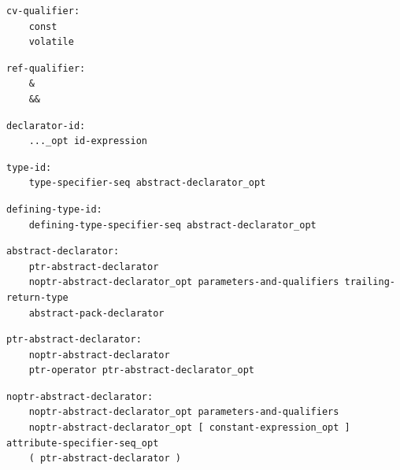 \noindent\textbf{\texttt{}}\par
\begin{lstlisting}
cv-qualifier:
    const
    volatile
\end{lstlisting}

\noindent\textbf{\texttt{}}\par
\begin{lstlisting}
ref-qualifier:
    &
    &&
\end{lstlisting}

\noindent\textbf{\texttt{}}\par
\begin{lstlisting}
declarator-id:
    ..._opt id-expression
\end{lstlisting}

\noindent\textbf{\texttt{}}\par
\begin{lstlisting}
type-id:
    type-specifier-seq abstract-declarator_opt
\end{lstlisting}

\noindent\textbf{\texttt{}}\par
\begin{lstlisting}
defining-type-id:
    defining-type-specifier-seq abstract-declarator_opt
\end{lstlisting}

\noindent\textbf{\texttt{}}\par
\begin{lstlisting}
abstract-declarator:
    ptr-abstract-declarator
    noptr-abstract-declarator_opt parameters-and-qualifiers trailing-return-type
    abstract-pack-declarator
\end{lstlisting}

\noindent\textbf{\texttt{}}\par
\begin{lstlisting}
ptr-abstract-declarator:
    noptr-abstract-declarator
    ptr-operator ptr-abstract-declarator_opt
\end{lstlisting}

\noindent\textbf{\texttt{}}\par
\begin{lstlisting}
noptr-abstract-declarator:
    noptr-abstract-declarator_opt parameters-and-qualifiers
    noptr-abstract-declarator_opt [ constant-expression_opt ] attribute-specifier-seq_opt
    ( ptr-abstract-declarator )
\end{lstlisting}

